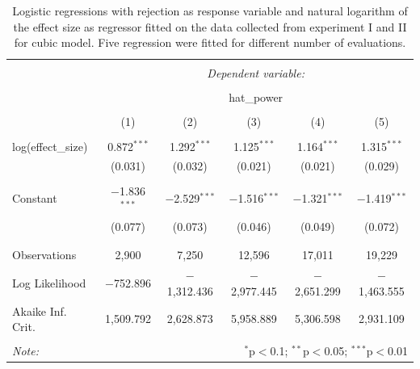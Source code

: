 \documentclass{monashthesis}
\theoremstyle{definition}
\theoremstyle{definition}
\theoremstyle{definition}
\theoremstyle{definition}
\theoremstyle{remark}
\begin{document}
\begin{table}[!htbp] \centering 
  \caption{Logistic regressions with rejection as response variable and natural logarithm of the effect size as regressor fitted on the data collected from experiment I and II for cubic model. Five regression were fitted for different number of evaluations.} 
  \label{tab:powerglmcubicsecond} 
\begin{tabular}{@{\extracolsep{5pt}}lccccc} 
\\[-1.8ex]\hline 
\hline \\[-1.8ex] 
 & \multicolumn{5}{c}{\textit{Dependent variable:}} \\ 
\cline{2-6} 
\\[-1.8ex] & \multicolumn{5}{c}{hat\_power} \\ 
\\[-1.8ex] & (1) & (2) & (3) & (4) & (5)\\ 
\hline \\[-1.8ex] 
 log(effect\_size) & 0.872$^{***}$ & 1.292$^{***}$ & 1.125$^{***}$ & 1.164$^{***}$ & 1.315$^{***}$ \\ 
  & (0.031) & (0.032) & (0.021) & (0.021) & (0.029) \\ 
  & & & & & \\ 
 Constant & $-$1.836$^{***}$ & $-$2.529$^{***}$ & $-$1.516$^{***}$ & $-$1.321$^{***}$ & $-$1.419$^{***}$ \\ 
  & (0.077) & (0.073) & (0.046) & (0.049) & (0.072) \\ 
  & & & & & \\ 
\hline \\[-1.8ex] 
Observations & 2,900 & 7,250 & 12,596 & 17,011 & 19,229 \\ 
Log Likelihood & $-$752.896 & $-$1,312.436 & $-$2,977.445 & $-$2,651.299 & $-$1,463.555 \\ 
Akaike Inf. Crit. & 1,509.792 & 2,628.873 & 5,958.889 & 5,306.598 & 2,931.109 \\ 
\hline 
\hline \\[-1.8ex] 
\textit{Note:}  & \multicolumn{5}{r}{$^{*}$p$<$0.1; $^{**}$p$<$0.05; $^{***}$p$<$0.01} \\ 
\end{tabular} 
\end{table}
\end{document}
